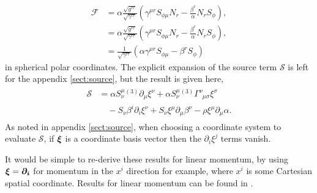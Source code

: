 \begin{align}
 \mathcal{F} &= \alpha\frac{\sqrt{g^{rr}}}{\sqrt{\gamma^{rr}}} (\gamma^{\mu r} S_{\phi\mu} N_r -\frac{\beta^r}{\alpha}N_r S_\phi), \\ 
 &= \alpha\frac{\sqrt{g^{rr}}}{\sqrt{\gamma^{rr}}} (\gamma^{\mu r} S_{\phi\mu} N_r -\frac{\beta^r}{\alpha}N_r S_\phi), \\ 
  \label{final_flux} &= \frac{1}{\sqrt{\gamma^{rr}}}\left(\alpha \gamma^{\mu r}S_{\phi\mu} -\beta^r S_\phi\right)
\end{align} 
in spherical polar coordinates. The explicit expansion of the source term $\mathcal{S}$ is left for the appendix \ref{sect:source}, but the result is given here,
\begin{align}\label{s_explicit_angmom} 
\begin{split}\mathcal{S} &= \alpha S^\mu_{\nu}{}^{(3)}\partial_\mu \xi^\nu + \alpha S^\mu_{\nu} {}^{(3)}\Gamma^\nu_{\,\,\,\mu \sigma} \xi^\sigma \\&\quad- S_\nu \beta^i \partial_i \xi^\nu  + S_\nu \xi^\mu \partial_\mu \beta^\nu - \rho \xi^\mu \partial_\mu \alpha.
\end{split}
\end{align}
As noted in appendix \ref{sect:source}, when choosing a coordinate system to evaluate $\mathcal{S}$, if $\boldsymbol{\xi}$ is a coordinate basis vector then the $\partial_i \xi^j$ terms vanish. 

It would be simple to re-derive these results for linear momentum, by using $\boldsymbol{\xi} = \boldsymbol{\partial_i}$ for momentum in the $x^i$ direction for example, where $x^i$ is some Cartesian spatial coordinate. Results for linear momentum can be found in \cite{Clough_2021}.





